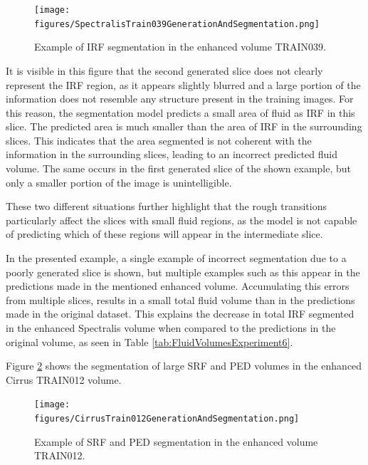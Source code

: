 \begin{figure}[h!]
	\centering	\texttt{[image: figures/SpectralisTrain039GenerationAndSegmentation.png]}
	\caption{Example of IRF segmentation in the enhanced volume TRAIN039.}
	\label{fig:SpectralisTrain039GenerationAndSegmentation}
\end{figure}

\clearpage

It is visible in this figure that the second generated slice does not clearly represent the IRF region, as it appears slightly blurred and a large portion of the information does not resemble any structure present in the training images. For this reason, the segmentation model predicts a small area of fluid as IRF in this slice. The predicted area is much smaller than the area of IRF in the surrounding slices. This indicates that the area segmented is not coherent with the information in the surrounding slices, leading to an incorrect predicted fluid volume. The same occurs in the first generated slice of the shown example, but only a smaller portion of the image is unintelligible. 
\par
These two different situations further highlight that the rough transitions particularly affect the slices with small fluid regions, as the model is not capable of predicting which of these regions will appear in the intermediate slice.
\par
In the presented example, a single example of incorrect segmentation due to a poorly generated slice is shown, but multiple examples such as this appear in the predictions made in the mentioned enhanced volume. Accumulating this errors from multiple slices, results in a small total fluid volume than in the predictions made in the original dataset. This explains the decrease in total IRF segmented in the enhanced Spectralis volume when compared to the predictions in the original volume, as seen in Table \ref{tab:FluidVolumesExperiment6}.
\par
Figure \ref{fig:CirrusTrain012GenerationAndSegmentation} shows the segmentation of large SRF and PED volumes in the enhanced Cirrus TRAIN012 volume.

\begin{figure}[!ht]
	\centering	\texttt{[image: figures/CirrusTrain012GenerationAndSegmentation.png]}
	\caption{Example of SRF and PED segmentation in the enhanced volume TRAIN012.}
	\label{fig:CirrusTrain012GenerationAndSegmentation}
\end{figure}

